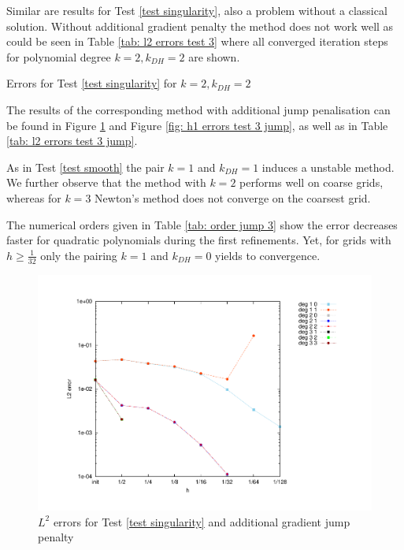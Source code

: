 Similar are results for Test \ref{test singularity}, also a problem without a classical solution. Without additional gradient penalty the method does not work well as could be seen in Table \ref{tab: l2 errors test 3} where all converged iteration steps for polynomial degree $k=2, k_{DH}=2$ are shown.
\begin{table}[H]
		\centering
		\pgfplotstabletypeset[
		columns={iterations, l2error, h1error,N},
		    every row 0 column 0/.style={set content=init},
		]{\MAThreedegTwoTwo}
	\caption{Errors for Test \ref{test singularity} for $k=2, k_{DH}=2$}
	\label{tab: l2 errors test 3}
\end{table}

The results of the corresponding method with additional jump penalisation can be found in Figure \ref{fig: l2 errors test 3 jump} and Figure \ref{fig: h1 errors test 3 jump}, as well as in Table \ref{tab: l2 errors test 3 jump}. 

As in Test \ref{test smooth} the pair $k=1$ and $k_{DH}=1$ induces a unstable method. We further observe that the method with $k=2$ performs well on coarse grids, whereas for $k=3$ Newton's method does not converge on the coarsest grid. 

The numerical orders given in Table \ref{tab: order jump 3} show the error decreases faster for quadratic polynomials during the first refinements. Yet, for grids with $h \geq \frac 1 {32}$ only the pairing $k=1$ and $k_{DH} =0$ yields to convergence.

\begin{figure}[H]
	\centering
	\includegraphics[scale =0.45]{plots/MA3_Neilan_GradJump_l2.pdf}
	\caption{$L^2$ errors for Test \ref{test singularity} and additional gradient jump penalty}
	\label{fig: l2 errors test 3 jump}
\end{figure}

